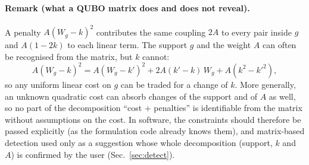 \paragraph{Remark (what a QUBO matrix does and does not reveal).}
A penalty $A(W_g-k)^2$ contributes the same coupling $2A$ to every pair inside $g$ and $A(1-2k)$ to each
linear term. The support $g$ and the weight $A$ can often be recognised from the matrix, but $k$ cannot:
\begin{equation}
A(W_g-k)^2 = A(W_g-k')^2 + 2A(k'-k)\,W_g + A(k^2-k'^2),
\end{equation}
so any uniform linear cost on $g$ can be traded for a change of $k$. More generally, an unknown quadratic
cost can absorb changes of the support and of $A$ as well, so no part of the decomposition
``cost $+$ penalties'' is identifiable from the matrix without assumptions on the cost. In software, the constraints
should therefore be passed explicitly (as the formulation code already knows them), and matrix-based
detection used only as a suggestion whose whole decomposition (support, $k$ and $A$) is confirmed by the user (Sec.~\ref{sec:detect}).
